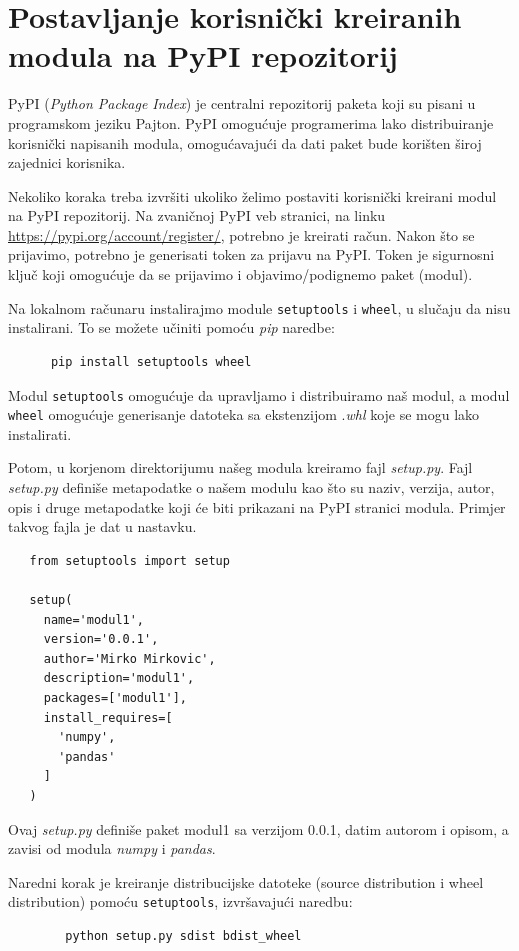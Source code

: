 \section{Postavljanje korisnički kreiranih modula  na PyPI repozitorij}

PyPI (\textit{Python Package Index}) je centralni repozitorij paketa   koji su pisani u programskom jeziku Pajton. PyPI omogućuje programerima lako distribuiranje korisnički napisanih modula,  omogućavajući da dati paket bude korišten široj zajednici korisnika.
 
Nekoliko   koraka   treba izvršiti ukoliko želimo postaviti   korisnički kreirani modul na PyPI repozitorij. Na zvaničnoj PyPI veb stranici, na linku  \url{https://pypi.org/account/register/},  potrebno je kreirati račun. Nakon što se prijavimo, potrebno je  generisati token za prijavu na PyPI. Token je sigurnosni ključ koji omogućuje da se prijavimo i objavimo/podignemo  paket (modul). 
 
 
 Na lokalnom računaru instalirajmo module  \texttt{setuptools} i \texttt{wheel}, u slučaju da nisu instalirani. To se možete učiniti pomoću \textit{pip} naredbe:
 \begin{verbatim}
      pip install setuptools wheel
 \end{verbatim}

Modul \texttt{setuptools} omogućuje da upravljamo i distribuiramo naš modul, a modul \texttt{wheel}   omogućuje generisanje datoteka sa ekstenzijom .\textit{whl} koje se mogu lako instalirati.

Potom,  u korjenom direktorijumu našeg modula  kreiramo fajl \textit{setup.py}. Fajl \textit{setup.py}  definiše metapodatke o našem modulu kao što su naziv, verzija, autor, opis i druge metapodatke koji će biti prikazani na PyPI stranici   modula. Primjer takvog fajla je dat u nastavku.

\begin{verbatim}
   from setuptools import setup
   
   setup(
     name='modul1',
     version='0.0.1',
     author='Mirko Mirkovic',
     description='modul1',
     packages=['modul1'],
     install_requires=[
       'numpy',
       'pandas'
     ]
   )
\end{verbatim}
Ovaj \textit{ setup.py}   definiše paket modul1 sa verzijom 0.0.1, datim autorom  i opisom, a zavisi od modula \textit{numpy} i \textit{pandas}.

Naredni korak je kreiranje distribucijske datoteke (source distribution i wheel distribution) pomoću \texttt{setuptools}, izvršavajući naredbu:
\begin{verbatim}
        python setup.py sdist bdist_wheel
\end{verbatim}
 
